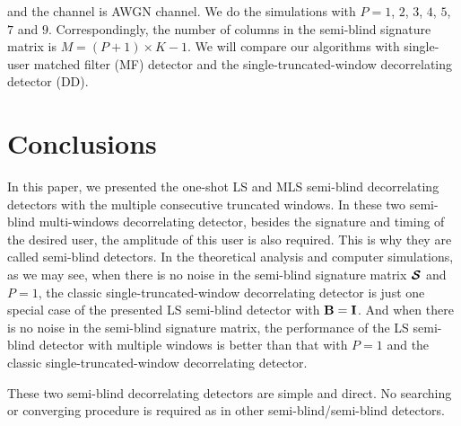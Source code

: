 \documentclass[a4paper,10pt,fleqn, twocolumn]{IEEETran}
\newcommand{\bI}{{\bf I}}
\newcommand{\bB}{{\bf B}}
\newcommand{\bcS}{{\mbox {\boldmath ${\cal S}$}}}
\begin{document}
\noindent and the channel is AWGN channel. We do the simulations
with $P=1$, $2$, $3$, $4$, $5$, $7$ and $9$. Correspondingly, the
number of columns in the semi-blind signature matrix is
$M=(P+1)\times K-1$. We will compare our algorithms with
single-user matched filter (MF) detector and the
single-truncated-window decorrelating detector (DD).

\section{Conclusions}

In this paper, we presented the one-shot LS and MLS semi-blind
decorrelating detectors with the multiple consecutive truncated
windows. In these two semi-blind multi-windows decorrelating
detector, besides the signature and timing of the desired user,
the amplitude of this user is also required. This is why they are
called semi-blind detectors. In the theoretical analysis and
computer simulations, as we may see, when there is no noise in the
semi-blind signature matrix $\bcS$ and $P=1$, the classic
single-truncated-window decorrelating detector is just one special
case of the presented LS semi-blind detector with $\bB=\bI$. And
when there is no noise in the semi-blind signature matrix, the
performance of the LS semi-blind detector with multiple windows is
better than that with $P=1$ and the classic
single-truncated-window decorrelating detector.

These two semi-blind decorrelating detectors are simple and
direct. No searching or converging procedure is required as in
other semi-blind/semi-blind detectors.



\end{document}
